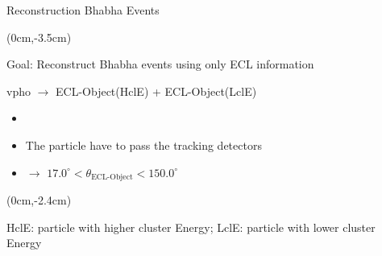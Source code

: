 \documentclass[8pt]{beamer}
\begin{document}
\begin{frame}{Reconstruction Bhabha Events}
\begin{textblock*}{11cm}
{\begin{figure}[h!]
\end{figure}
}

\end{textblock*}








\begin{textblock*}{11cm}(0cm,-3.5cm)
	\begin{center}
		
		Goal: Reconstruct Bhabha events using only ECL information
		
		vpho $\rightarrow$ ECL-Object(HclE) + ECL-Object(LclE)


	\end{center}



	\begin{itemize}
		\item[]
		\item The particle have to pass the tracking detectors
		\centering
		\item[] $\rightarrow$ $17.0^{\circ} < \theta_{\textrm{ECL-Object}} < 150.0^{\circ}$
	\end{itemize}	
\end{textblock*}


\begin{textblock*}{11cm}(0cm,-2.4cm)
	\begin{center}
		\footnotesize{HclE: particle with higher cluster Energy; LclE: particle with lower cluster Energy}
	\end{center}
\end{textblock*}





\end{frame}
\end{document}
